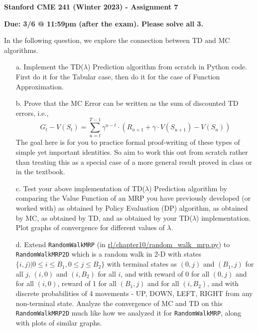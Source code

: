 \documentclass[12pt]{exam}
\begin{document}
\begin{center}
{\large {\bf Stanford CME 241 (Winter 2023) - Assignment 7}}
\end{center}
 
{\large{\bf Due: 3/6 @ 11:59pm (after the exam). Please solve all 3.}} \\
\begin{questions}

\question In the following question, we explore the connection between TD and MC algorithms. 
\begin{enumerate} 
	\item[a.] Implement the TD($\lambda$) Prediction algorithm from scratch in Python code. First do it for the Tabular case, then do it for the case of Function Approximation. 
	\item[b.] Prove that the MC Error can be written as the sum of discounted TD errors, i.e.,
$$G_t - V(S_t) = \sum_{u=t}^{T-1} \gamma^{u-t} \cdot (R_{u+1} + \gamma \cdot V(S_{u+1}) - V(S_u))$$
The goal here is for you to practice formal proof-writing of these types of simple yet important identities. So aim to work this out from scratch rather than treating this as a special case of a more general result proved in class or in the textbook.
	\item[c.] Test your above implementation of TD($\lambda$) Prediction algorithm by comparing the Value Function of an MRP you have previously developed (or worked with) as obtained by Policy Evaluation (DP) algorithm, as obtained by MC, as obtained by TD, and as obtained by your TD($\lambda$) implementation. Plot graphs of convergence for different values of $\lambda$.
	\item[d.]  Extend \lstinline{RandomWalkMRP} (in \href{https://github.com/TikhonJelvis/RL-book/blob/master/rl/chapter10/random_walk_mrp.py}{rl\//chapter10\//random\_walk\_mrp.py}) to \lstinline{RandomWalkMRP2D} which is a random walk in 2-D with states $\{i, j) | 0 \leq i \leq B_1, 0 \leq j \leq B_2\}$ with terminal states as $(0, j)$ and $(B_1, j)$ for all $j$, $(i, 0)$ and $(i, B_2)$ for all $i$, and with reward of 0 for all $(0, j)$ and for all $(i, 0)$, reward of 1 for all $(B_1, j)$ and for all $(i, B_2)$, and with discrete probabilities of 4 movements - UP, DOWN, LEFT, RIGHT from any non-terminal state. Analyze the convergence of MC and TD on this \lstinline{RandomWalkMRP2D} much like how we analyzed it for \lstinline{RandomWalkMRP}, along with plots of similar graphs.
\end{enumerate}


\end{questions}
\end{document}
